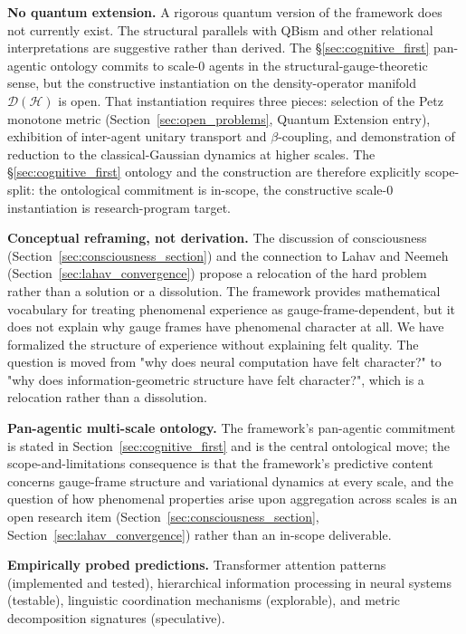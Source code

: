 \documentclass[11pt]{article}
\begin{document}
\textbf{No quantum extension.} A rigorous quantum version of the framework does not currently exist. The structural parallels with QBism and other relational interpretations are suggestive rather than derived. The §\ref{sec:cognitive_first} pan-agentic ontology commits to scale-0 agents in the structural-gauge-theoretic sense, but the constructive instantiation on the density-operator manifold $\mathcal{D}(\mathcal{H})$ is open. That instantiation requires three pieces: selection of the Petz monotone metric (Section~\ref{sec:open_problems}, Quantum Extension entry), exhibition of inter-agent unitary transport and $\beta$-coupling, and demonstration of reduction to the classical-Gaussian dynamics at higher scales. The §\ref{sec:cognitive_first} ontology and the construction are therefore explicitly scope-split: the ontological commitment is in-scope, the constructive scale-0 instantiation is research-program target.

\textbf{Conceptual reframing, not derivation.} The discussion of consciousness (Section~\ref{sec:consciousness_section}) and the connection to Lahav and Neemeh (Section~\ref{sec:lahav_convergence}) propose a relocation of the hard problem rather than a solution or a dissolution. The framework provides mathematical vocabulary for treating phenomenal experience as gauge-frame-dependent, but it does not explain why gauge frames have phenomenal character at all. We have formalized the structure of experience without explaining felt quality. The question is moved from "why does neural computation have felt character?" to "why does information-geometric structure have felt character?", which is a relocation rather than a dissolution.

\textbf{Pan-agentic multi-scale ontology.} The framework's pan-agentic commitment is stated in Section~\ref{sec:cognitive_first} and is the central ontological move; the scope-and-limitations consequence is that the framework's predictive content concerns gauge-frame structure and variational dynamics at every scale, and the question of how phenomenal properties arise upon aggregation across scales is an open research item (Section~\ref{sec:consciousness_section}, Section~\ref{sec:lahav_convergence}) rather than an in-scope deliverable.

\textbf{Empirically probed predictions.} Transformer attention patterns (implemented and tested), hierarchical information processing in neural systems (testable), linguistic coordination mechanisms (explorable), and metric decomposition signatures (speculative).
\end{document}
